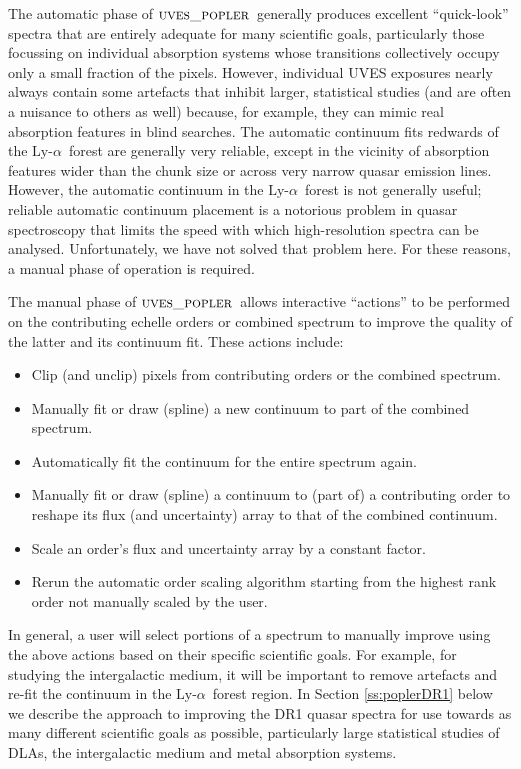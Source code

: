 \documentclass[fleqn,usenatbib,usedcolumn]{mnras}
\newcommand{\Sref}[1]{Section \ref{#1}}
\newcommand{\lya}{\ensuremath{\textrm{Ly-}\alpha}}
\newcommand{\popler}{\ensuremath{\textsc{uves\_popler}}}
\begin{document}
The automatic phase of \popler\ generally produces excellent ``quick-look'' spectra that are entirely adequate for many scientific goals, particularly those focussing on individual absorption systems whose transitions collectively occupy only a small fraction of the pixels. However, individual UVES exposures nearly always contain some artefacts that inhibit larger, statistical studies (and are often a nuisance to others as well) because, for example, they can mimic real absorption features in blind searches. The automatic continuum fits redwards of the \lya\ forest are generally very reliable, except in the vicinity of absorption features wider than the chunk size or across very narrow quasar emission lines. However, the automatic continuum in the \lya\ forest is not generally useful; reliable automatic continuum placement is a notorious problem in quasar spectroscopy that limits the speed with which high-resolution spectra can be analysed. Unfortunately, we have not solved that problem here. For these reasons, a manual phase of operation is required.

The manual phase of \popler\ allows interactive ``actions'' to be performed on the contributing echelle orders or combined spectrum to improve the quality of the latter and its continuum fit. These actions include:
\begin{itemize}
\item Clip (and unclip) pixels from contributing orders or the combined spectrum.
\item Manually fit or draw (spline) a new continuum to part of the combined spectrum.
\item Automatically fit the continuum for the entire spectrum again.
\item Manually fit or draw (spline) a continuum to (part of) a contributing order to reshape its flux (and uncertainty) array to that of the combined continuum.
\item Scale an order's flux and uncertainty array by a constant factor.
\item Rerun the automatic order scaling algorithm starting from the highest rank order not manually scaled by the user.
\end{itemize}
In general, a user will select portions of a spectrum to manually improve using the above actions based on their specific scientific goals. For example, for studying the intergalactic medium, it will be important to remove artefacts and re-fit the continuum in the \lya\ forest region. In \Sref{ss:poplerDR1} below we describe the approach to improving the DR1 quasar spectra for use towards as many different scientific goals as possible, particularly large statistical studies of DLAs, the intergalactic medium and metal absorption systems.
\end{document}
